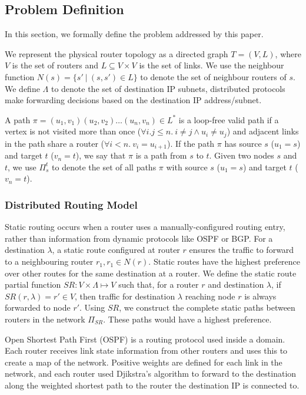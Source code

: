 \subsection{Problem Definition}
In this section, we formally define the problem addressed by this paper.

We represent the physical router topology as a directed graph $T=(V, L)$,
where $V$ is the set of routers and $L\subseteq V\times V$ is the set of links. 
We use the neighbour function $N(s) = \{s'\ | \ (s,s') \in L \}$ to denote 
the set of neighbour routers of $s$. 
We define $\Lambda$ to denote the set of destination IP subnets, 
distributed protocols make forwarding decisions based on the 
destination IP address/subnet.

A path $\pi = (u_1,v_1) (u_2, v_2) \ldots (u_n, v_n) \in L^*$ is a loop-free valid path if
a  vertex is not visited more than once ($\forall i.j \leq n. 
~i \not= j \wedge u_i \not= u_j$) and adjacent links in the
path share a router ($\forall i < n. ~v_i = u_{i+1}$).
If the path $\pi$ has source $s$ ($u_1=s$) and target $t$ ($v_n=t$),
we say that $\pi$ is a path from $s$ to $t$.
Given two nodes $s$ and $t$, we use $\Pi_s^t$ to denote the set of all paths
$\pi$ with source $s$ ($u_1=s$) and target $t$ ($v_n=t$).

\subsubsection{Distributed Routing Model}
Static routing occurs when a router uses a 
manually-configured routing entry, 
rather than information from dynamic protocols like
OSPF or BGP.  
For a destination $\lambda$, a static route configured
at router $r$ ensures the traffic to forward to a 
neighbouring router $r_1, r_1 \in N(r)$. 
Static routes have the highest
preference over other routes for the same destination
at a router. We define the static route
partial function $SR: V \times \Lambda \mapsto V$ such
that, for a router $r$ and destination $\lambda$, if $SR(r,\lambda)=r'\in V$, 
then traffic for destination $\lambda$ reaching node $r$ is always
forwarded to node $r'$. Using $SR$, we construct the complete
static paths between routers in the network $\Pi_{SR}$. These 
paths would have a highest preference. 

Open Shortest Path First (OSPF) is a routing protocol used inside a
domain. Each router receives link state information from other routers
and uses this to create a map of the network. Positive weights
are defined for each link in the network, and 
each router used Djikstra's algorithm to
forward to the destination along the weighted shortest path 
to the router the destination IP is connected to. 

